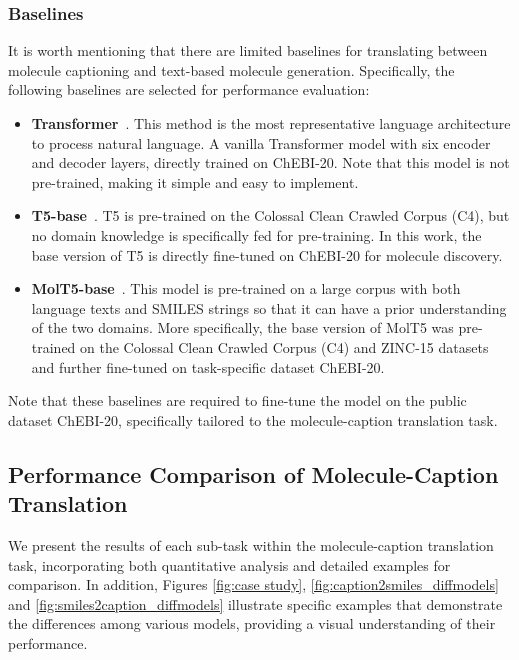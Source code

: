 \documentclass{article}
\theoremstyle{plain}
\theoremstyle{definition}
\theoremstyle{remark}
\begin{document}
\subsubsection{Baselines}
It is worth mentioning that there are limited baselines for translating between molecule captioning and text-based molecule generation.
Specifically, the following baselines are selected for performance evaluation:
\begin{itemize}
    \item \textbf{Transformer}~\cite{vaswani2017attention}. This method is the most representative language architecture to process natural language. 
    A vanilla Transformer model with six encoder and decoder layers, directly trained on ChEBI-20. Note that this model is not pre-trained, making it simple and easy to implement. 
    
    \item \textbf{T5-base}~\cite{raffel2020exploring}. 
    T5 is pre-trained on the Colossal Clean Crawled Corpus (C4), but no domain knowledge is specifically fed for pre-training.
    In this work, the base version of T5 is directly fine-tuned on ChEBI-20 for molecule discovery. 
    
    \item \textbf{MolT5-base}~\cite{edwards-etal-2022-translation}. 
     This model is pre-trained on a large corpus with both language texts and SMILES strings so that it can have a prior understanding of the two domains.
    More specifically, the base version of MolT5 was pre-trained on the Colossal Clean Crawled Corpus (C4) and ZINC-15 datasets and further fine-tuned on task-specific dataset ChEBI-20.
\end{itemize}
Note that these baselines are required to fine-tune the model on the public dataset ChEBI-20, specifically tailored to the molecule-caption translation task.

\subsection{Performance Comparison of Molecule-Caption Translation}
We present the results of each sub-task within the molecule-caption translation task, incorporating both quantitative analysis and detailed examples for comparison. 
In addition, Figures \ref{fig:case study}, \ref{fig:caption2smiles_diffmodels} and \ref{fig:smiles2caption_diffmodels} illustrate specific examples that demonstrate the differences among various models, providing a visual understanding of their performance.
\end{document}

